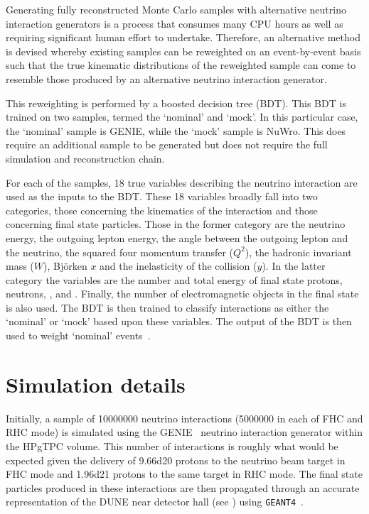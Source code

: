 Generating fully reconstructed Monte Carlo samples with alternative neutrino interaction generators is a process that consumes many CPU hours as well as requiring significant human effort to undertake.
Therefore, an alternative method is devised whereby existing samples can be reweighted on an event-by-event basis such that the true kinematic distributions of the reweighted sample can come to resemble those produced by an alternative neutrino interaction generator.

This reweighting is performed by a boosted decision tree (BDT).
This BDT is trained on two samples, termed the `nominal' and `mock'.
In this particular case, the `nominal' sample is GENIE, while the `mock' sample is NuWro.
This does require an additional sample to be generated but does not require the full simulation and reconstruction chain.

For each of the samples, 18 true variables describing the neutrino interaction are used as the inputs to the BDT.
These 18 variables broadly fall into two categories, those concerning the kinematics of the interaction and those concerning final state particles. Those in the former category are the neutrino energy, the outgoing lepton energy, the angle between the outgoing lepton and the neutrino, the squared four momentum transfer ($Q^{2}$), the hadronic invariant mass ($W$), Bj\"orken $x$ and the inelasticity of the collision ($y$).
In the latter category the variables are the number and total energy of final state protons, neutrons, \piplus, \piminus and \pizero. 
Finally, the number of electromagnetic objects in the final state is also used.
The BDT is then trained to classify interactions as either the `nominal' or `mock' based upon these variables.
The output of the BDT is then used to weight `nominal' events~\cite{vilelaBDT}.

\section{Simulation details}
\label{sec:dune_ndrwt:simDetails}

Initially, a sample of \num{10000000} neutrino interactions (\num{5000000} in each of FHC and RHC mode) is simulated using the GENIE~\cite{genie} neutrino interaction generator within the HPgTPC volume.
This number of interactions is roughly what would be expected given the delivery of \num{9.66d20} protons to the neutrino beam target in FHC mode and \num{1.96d21} protons to the same target in RHC mode.
The final state particles produced in these interactions are then propagated through an accurate representation of the DUNE near detector hall (see ) using \texttt{GEANT4}~\cite{geant}. 
 
